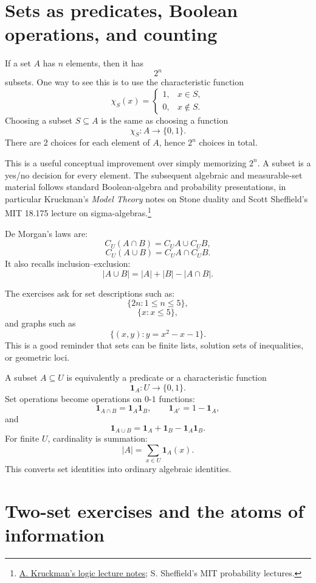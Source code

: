 
\section{Sets as predicates, Boolean operations, and counting}

If a set \(A\) has \(n\) elements, then it has
\[
  2^n
\]
subsets.  One way to see this is to use the characteristic function
\[
  \chi_S(x)=
  \begin{cases}
  1,&x\in S,\\
  0,&x\notin S.
  \end{cases}
\]
Choosing a subset \(S\subseteq A\) is the same as choosing a function
\[
  \chi_S:A\to\{0,1\}.
\]
There are \(2\) choices for each element of \(A\), hence \(2^n\) choices in total.

This is a useful conceptual improvement over simply memorizing \(2^n\).  A subset is a yes/no decision for every element. The subsequent algebraic and measurable-set material follows standard Boolean-algebra and probability presentations, in particular Kruckman's \emph{Model Theory} notes on Stone duality and Scott Sheffield's MIT 18.175 lecture on sigma-algebras.\footnote{\href{https://akruckman.faculty.wesleyan.edu/files/2019/07/Lecture-Notes.pdf}{A. Kruckman's logic lecture notes}; S. Sheffield's MIT probability lectures.}

De Morgan's laws are:
\[
  C_U(A\cap B)=C_UA\cup C_UB,
\]
\[
  C_U(A\cup B)=C_UA\cap C_UB.
\]
It also recalls inclusion--exclusion:
\[
  |A\cup B|=|A|+|B|-|A\cap B|.
\]

The exercises ask for set descriptions such as:
\[
  \{2n:1\le n\le5\},
\]
\[
  \{x:x\le5\},
\]
and graphs such as
\[
  \{(x,y):y=x^2-x-1\}.
\]
This is a good reminder that sets can be finite lists, solution sets of inequalities, or geometric loci.

A subset \(A\subseteq U\) is equivalently a predicate or a characteristic function
\[
  \mathbf 1_A:U\to\{0,1\}.
\]
Set operations become operations on \(0\)-\(1\) functions:
\[
  \mathbf 1_{A\cap B}=\mathbf 1_A\mathbf 1_B,\qquad
  \mathbf 1_{A^c}=1-\mathbf 1_A,
\]
and
\[
  \mathbf 1_{A\cup B}=\mathbf 1_A+\mathbf 1_B-\mathbf 1_A\mathbf 1_B.
\]
For finite \(U\), cardinality is summation:
\[
  |A|=\sum_{x\in U}\mathbf 1_A(x).
\]
This converts set identities into ordinary algebraic identities.

\section{Two-set exercises and the atoms of information}

